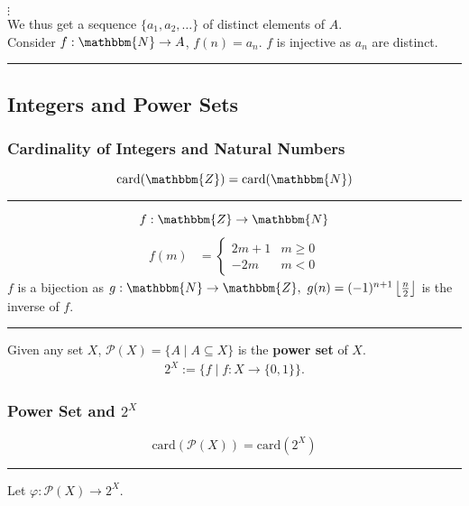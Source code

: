 \documentclass[10pt]{extarticle}
\begin{document}
      $\vdots$\\

      We thus get a sequence $\{a_1,a_2,\dots\}$ of distinct elements of $A$.\\

      Consider $f:\mathbbm{N} \rightarrow A$, $f(n) = a_n$. $f$ is injective as $a_n$ are distinct.\\
      \vspace{4pt}
      \rule{\textwidth}{0.4pt}
    \subsection{Integers and Power Sets}%
    \subsubsection{Cardinality of Integers and Natural Numbers}%
      \[
        \text{card}(\mathbbm{Z}) = \text{card}(\mathbbm{N})
      \] 
      \vspace{4pt}
      \rule{\textwidth}{0.4pt}
      \vspace{4pt}
      \[
        f:\mathbbm{Z} \rightarrow \mathbbm{N}
      \] 
      \begin{align*}
        f(m) &= \begin{cases}
          2m + 1 & m\geq 0\\
          -2m & m<0
        \end{cases}
      \end{align*}
      $f$ is a bijection as $g:\mathbbm{N} \rightarrow \mathbbm{Z},~g(n) = (-1)^{n+1}\left\lfloor \frac{n}{2}\right\rfloor$ is the inverse of $f$.\\
      \vspace{4pt}
      \rule{\textwidth}{0.4pt}
      \vspace{4pt}
      Given any set $X$, $\mathcal{P}(X) = \{A \mid A\subseteq X\}$ is the \textbf{power set} of $X$.
      \begin{align*}
        2^X:= \{f\mid f:X\rightarrow \{0,1\}\}.
      \end{align*}
      \subsubsection{Power Set and $2^{X}$}%
      \[
        \text{card}(\mathcal{P}(X)) = \text{card}(2^X)
      \] 
      \vspace{4pt}
      \rule{\textwidth}{0.4pt}
      \vspace{4pt}
      Let $\varphi: \mathcal{P}(X) \rightarrow 2^X$.\\
\end{document}
